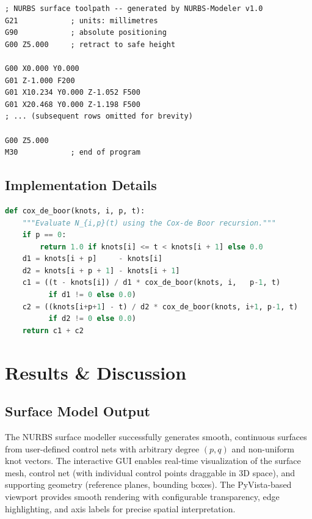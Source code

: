 \documentclass[a4paper,12pt]{article}
\begin{document}
\begin{lstlisting}[language={},
                   caption={Representative G-code snippet for a
                             NURBS-sampled surface toolpath.},
                   label={lst:gcode}]
; NURBS surface toolpath -- generated by NURBS-Modeler v1.0
G21            ; units: millimetres
G90            ; absolute positioning
G00 Z5.000     ; retract to safe height

G00 X0.000 Y0.000
G01 Z-1.000 F200
G01 X10.234 Y0.000 Z-1.052 F500
G01 X20.468 Y0.000 Z-1.198 F500
; ... (subsequent rows omitted for brevity)

G00 Z5.000
M30            ; end of program
\end{lstlisting}

\subsection{Implementation Details}

\begin{lstlisting}[language=Python,
                   caption={Core NURBS basis-function evaluation (relevant
                             excerpt from \texttt{nurbs\_core.py}).},
                   label={lst:python}]
def cox_de_boor(knots, i, p, t):
    """Evaluate N_{i,p}(t) using the Cox-de Boor recursion."""
    if p == 0:
        return 1.0 if knots[i] <= t < knots[i + 1] else 0.0
    d1 = knots[i + p]     - knots[i]
    d2 = knots[i + p + 1] - knots[i + 1]
    c1 = ((t - knots[i]) / d1 * cox_de_boor(knots, i,   p-1, t)
          if d1 != 0 else 0.0)
    c2 = ((knots[i+p+1] - t) / d2 * cox_de_boor(knots, i+1, p-1, t)
          if d2 != 0 else 0.0)
    return c1 + c2
\end{lstlisting}

\section{Results \& Discussion}

\subsection{Surface Model Output}

The NURBS surface modeller successfully generates smooth, continuous surfaces
from user-defined control nets with arbitrary degree $(p, q)$ and non-uniform
knot vectors. The interactive GUI enables real-time visualization of the
surface mesh, control net (with individual control points draggable in 3D
space), and supporting geometry (reference planes, bounding boxes). The
PyVista-based viewport provides smooth rendering with configurable
transparency, edge highlighting, and axis labels for precise spatial
interpretation.
\end{document}
